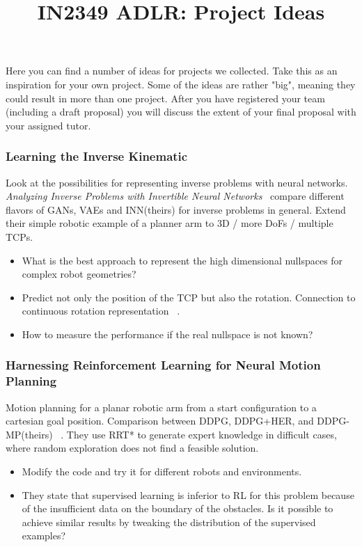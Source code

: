 \documentclass[a4paper]{article}
\title{IN2349 ADLR: Project Ideas}
\begin{document}
\maketitle

Here you can find a number of ideas for projects we collected. Take this as an inspiration for your own project. Some of the ideas are rather "big", meaning they could result in more than one project. After you have registered your team (including a draft proposal) you will discuss the extent of your final proposal with your assigned tutor.


\subsubsection{Learning the Inverse Kinematic}
Look at the possibilities for representing inverse problems with neural networks.
\textit{Analyzing Inverse Problems with Invertible Neural Networks}~\cite{Ardizzone2018}
compare different flavors of GANs, VAEs and INN(theirs) for inverse problems in general. Extend their simple robotic example of a planner arm to 3D / more DoFs / multiple TCPs.
\begin{itemize}
  \item What is the best approach to represent the high dimensional nullspaces for complex robot geometries?
  \item Predict not only the position of the TCP but also the rotation. Connection to continuous rotation representation ~\cite{Zhou2018}.
  \item How to measure the performance if the real nullspace is not known?
\end{itemize}

\subsubsection{Harnessing Reinforcement Learning for Neural Motion Planning}
Motion planning for a planar robotic arm from a start configuration to a cartesian goal position. Comparison between DDPG, DDPG+HER, and DDPG-MP(theirs) ~\cite{Jurgenson2019}.
They use RRT* to generate expert knowledge in difficult cases, where random exploration does not find a feasible solution.
\begin{itemize}
    \item Modify the code and try it for different robots and environments.
    \item They state that supervised learning is inferior to RL for this problem because of the insufficient data on the boundary of the obstacles. Is it possible to achieve similar results by tweaking the distribution of the supervised examples?
\end{itemize}
\end{document}
